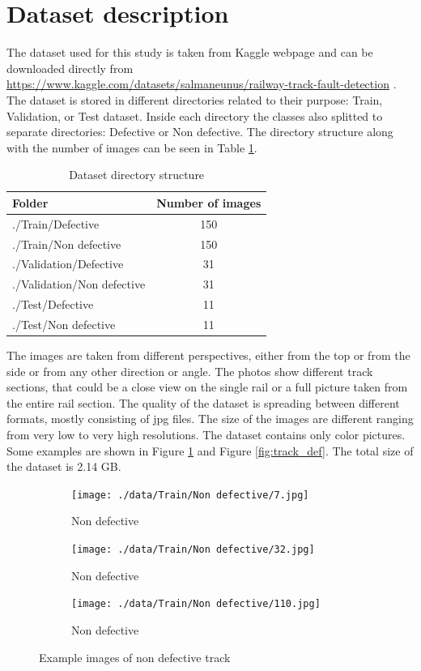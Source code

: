 \documentclass[10pt, final]{article}
\begin{document}
	\section{Dataset description} \label{sec:data_desc}
		The dataset used for this study is taken from Kaggle webpage \cite*{noauthor_kaggle_nodate}
		and can be downloaded directly from 
		\url{https://www.kaggle.com/datasets/salmaneunus/railway-track-fault-detection}
		\cite*{noauthor_railway_nodate}.
		The dataset is stored in different directories related to their purpose: Train, Validation,
		or Test dataset.
		Inside each directory the classes also splitted to separate directories: Defective or Non defective.
		The directory structure along with the number of images can be seen in Table \ref{table:dir_struct}.
		\begin{table}[!ht]
			\centering
			\begin{tabular}{l c}
				Folder & Number of images \\
				\hline
				./Train/Defective & 150 \\
				./Train/Non defective & 150 \\
				./Validation/Defective & 31 \\
				./Validation/Non defective & 31 \\
				./Test/Defective & 11 \\
				./Test/Non defective & 11 \\
				\hline
			\end{tabular}
			\caption{Dataset directory structure}
			\label{table:dir_struct}
		\end{table}
		The images are taken from different perspectives, either from the top or from the side or from 
		any other direction or angle.
		The photos show different track sections, that could be a close view on the single rail or 
		a full picture taken from the entire rail section.
		The quality of the dataset is spreading between different formats, mostly consisting of jpg files.
		The size of the images are different ranging from very low to very high resolutions.
		The dataset contains only color pictures.
		Some examples are shown in Figure \ref{fig:track_non_def} and Figure \ref{fig:track_def}.
		The total size of the dataset is 2.14 GB.
		\begin{figure}[!ht]
			\centering
			\begin{subfigure}{0.3\textwidth}
				\centering
				\texttt{[image: ./data/Train/Non defective/7.jpg]}
				\caption{Non defective}
			\end{subfigure}
			\begin{subfigure}{0.3\textwidth}
				\centering
				\texttt{[image: ./data/Train/Non defective/32.jpg]}
				\caption{Non defective}
			\end{subfigure}
			\begin{subfigure}{0.3\textwidth}
				\centering
				\texttt{[image: ./data/Train/Non defective/110.jpg]}
				\caption{Non defective}
			\end{subfigure}
			\caption{Example images of non defective track}
			\label{fig:track_non_def}
		\end{figure}
\end{document}
